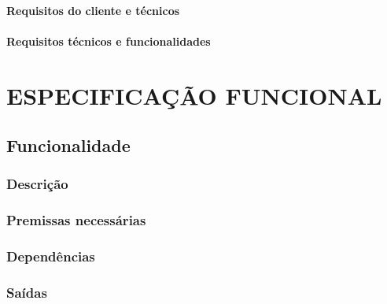 \subsubsection{Requisitos do cliente e técnicos}
\label{sec:reqclitec}

\subsubsection{Requisitos técnicos e funcionalidades}
\label{sec:reqtecfunc}

\chapter{ESPECIFICAÇÃO FUNCIONAL}
\label{chap:espfunc}

\section{Funcionalidade}
\label{sec:func1}

\subsection{Descrição}
\label{sec:desc1}

\subsection{Premissas necessárias}
\label{sec:prem1}

\subsection{Dependências}
\label{sec:dep1}

\subsection{Saídas}
\label{sec:said1}

